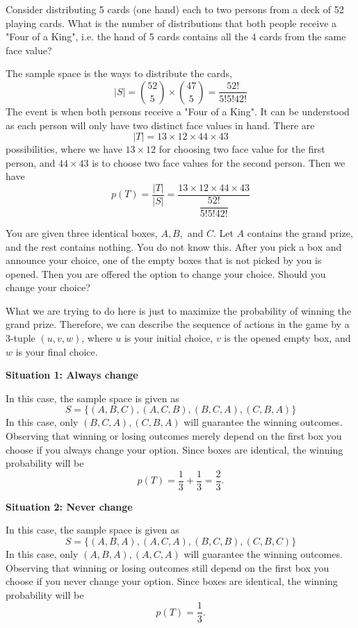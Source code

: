 \begin{eg}[Poker]
Consider distributing 5 cards (one hand) each to two persons from a deck of 52 playing cards. What is the number of distributions that both people receive a "Four of a King", i.e. the hand of 5 cards contains all the 4 cards from the same face value? 

The sample space is the ways to distribute the cards, 
\[
    \vert S \vert = \binom{52}{5} \times \binom{47}{5} = \dfrac{52!}{5!5!42!}
\]
The event is when both persons receive a "Four of a King". It can be understood as each person will only have two distinct face values in hand. There are 
\[
\vert T \vert = 13 \times 12 \times 44 \times 43
\]
possibilities, where we have \(13 \times 12\) for choosing two face value for the first person, and \(44 \times 43\) is to choose two face values for the second person. Then we have 
\[
    p(T) = \dfrac{\vert T \vert}{\vert S \vert} = \dfrac{13 \times 12 \times 44 \times 43}{\dfrac{52!}{5!5!42!}}
\]
\end{eg}

\begin{eg}
    You are given three identical boxes, \(A, B,\) and \(C\). Let \(A\) contains the grand prize, and the rest contains nothing. You do not know this. After you pick a box and announce your choice, one of the empty boxes that is not picked by you is opened. Then you are offered the option to change your choice. Should you change your choice?

    What we are trying to do here is just to maximize the probability of winning the grand prize. Therefore, we can describe the sequence of actions in the game by a 3-tuple \((u, v, w)\), where \(u\) is your initial choice, \(v\) is the opened empty box, and \(w\) is your final choice. 

    \textbf{Situation 1: Always change} 

    In this case, the sample space is given as
    \[
        S = \{(A, B, C), (A, C, B), (B, C, A), (C, B, A)\}
    \]
    In this case, only \((B, C, A), (C, B, A)\) will guarantee the winning outcomes. Observing that winning or losing outcomes merely depend on the first box you choose if you always change your option. Since boxes are identical, the winning probability will be 
    \[
    p(T) = \dfrac{1}{3} + \dfrac{1}{3} = \dfrac{2}{3}.
    \]

    \textbf{Situation 2: Never change} 

    In this case, the sample space is given as
    \[
        S = \{(A, B, A), (A, C, A), (B, C, B), (C, B, C)\}
    \]
    In this case, only \((A, B, A), (A, C, A)\) will guarantee the winning outcomes. Observing that winning or losing outcomes still depend on the first box you choose if you never change your option. Since boxes are identical, the winning probability will be 
    \[
    p(T) = \dfrac{1}{3}.
    \]
\end{eg}


